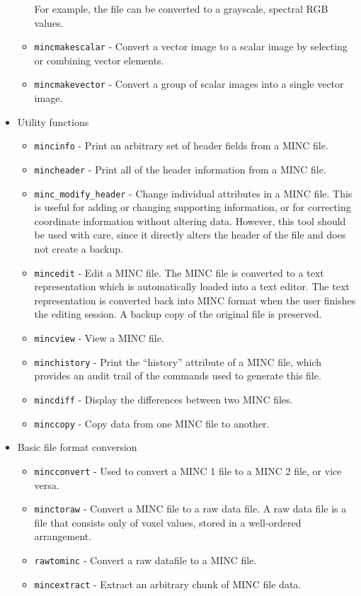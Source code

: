 \documentclass{article}
\begin{document}
\begin{itemize}
\begin{itemize}
For example, the file can be converted to a grayscale, spectral RGB values.
\item {\tt mincmakescalar} - Convert a vector image to a scalar image by
selecting or combining vector elements.
\item {\tt mincmakevector} - Convert a group of scalar images into a 
single vector image.
\end{itemize}
\item Utility functions
\begin{itemize}
\item {\tt mincinfo} - Print an arbitrary set of header fields from a
MINC file.
\item {\tt mincheader} - Print all of the header information from a MINC file.
\item {\tt minc\_modify\_header} - Change individual attributes in a
MINC file. This is useful for adding or changing supporting information,
or for correcting coordinate information without altering data.
However, this tool should be used with care, since it directly alters
the header of the file and does not create a backup.
\item {\tt mincedit} - Edit a MINC file.  The MINC file is converted to
  a text representation which is automatically loaded into a text
  editor. The text representation is converted back into MINC format
  when the user finishes the editing session.  A backup copy of the
  original file is preserved.
\item {\tt mincview} - View a MINC file.
\item {\tt minchistory} - Print the ``history'' attribute of a MINC file, which
provides an audit trail of the commands used to generate this file.
\item {\tt mincdiff} - Display the differences between two MINC files.
\item {\tt minccopy} - Copy data from one MINC file to another.
\end{itemize}
\item Basic file format conversion
\begin{itemize}
\item {\tt mincconvert} - Used to convert a MINC 1 file to a MINC 2 file, or
vice versa.
\item {\tt minctoraw} - Convert a MINC file to a raw data file.  A raw
data file is a file that consists only of voxel values, stored in a
well-ordered arrangement.
\item {\tt rawtominc} - Convert a raw datafile to a MINC file.
\item {\tt mincextract} - Extract an arbitrary chunk of MINC file data.

\end{itemize}
\end{itemize}
\end{document}
